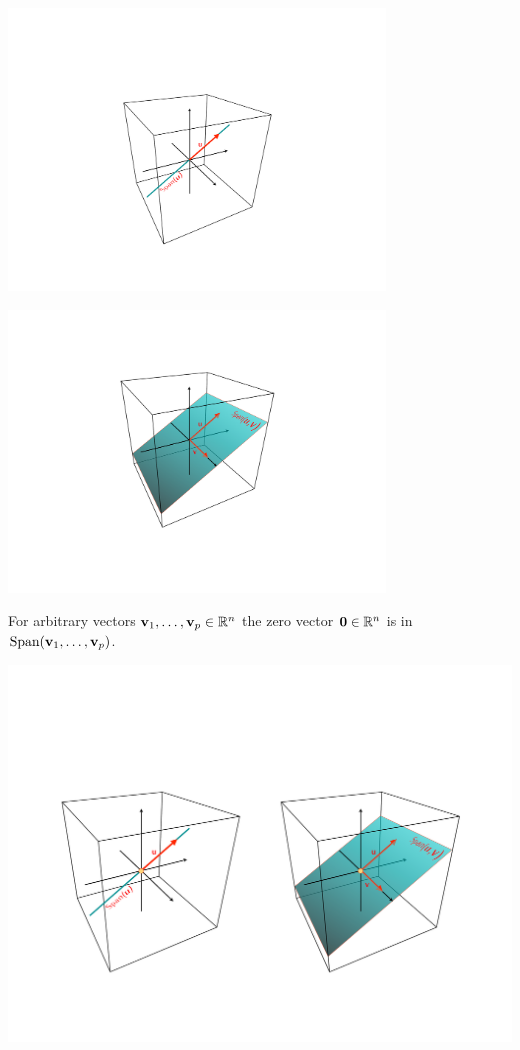 {\includegraphics[width=100mm]{span1.pdf}

\includegraphics[width=100mm]{span2.pdf}

\newpage

\begin{cbox}[Proposition]
For arbitrary vectors ${\bf v}_{1}, \dots, {\bf v}_{p} \in {\mathbb R}^{n}$ the zero vector ${\bf 0}\in {\mathbb R}^{n}$ is in \\
$\text{Span}({\bf v}_{1}, \dots, {\bf v}_{p})$.
\end{cbox}

\vskip 80mm


\begin{center}
\includegraphics[width=160mm]{span-zero.pdf}
\end{center}


}
